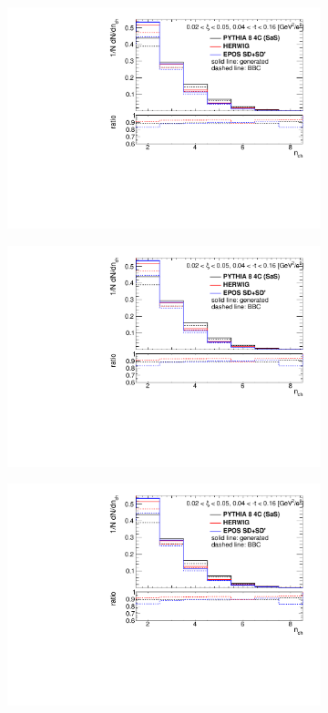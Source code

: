 \begin{figure}[h!]
	\centering
	\begin{subfigure}{.45\textwidth}
		\includegraphics[width=\textwidth,page=11]{chapters/chrgSTAR/img/bbcCorrection/xi_bbc.pdf}
	\end{subfigure}
	\begin{subfigure}{.45\textwidth}
		\includegraphics[width=\textwidth,page=12]{chapters/chrgSTAR/img/bbcCorrection/xi_bbc.pdf}
	\end{subfigure}
	\begin{subfigure}{.45\textwidth}
		\includegraphics[width=\textwidth,page=13]{chapters/chrgSTAR/img/bbcCorrection/xi_bbc.pdf}

\end{subfigure}
\end{figure}
